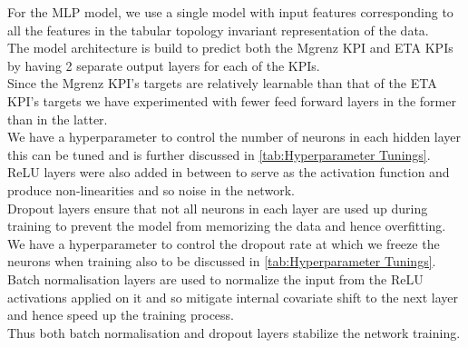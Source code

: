 \documentclass{report} %
\begin{document}
For the \ac{MLP} model, we use a single model with input features corresponding to all the features in the tabular topology invariant representation of the data.\\
The model architecture is build to predict both the Mgrenz \ac{KPI} and ETA \ac{KPI}s by having 2 separate output layers for each of the \ac{KPI}s. \\
Since the Mgrenz \ac{KPI}'s targets are relatively learnable than that of the ETA \ac{KPI}'s targets we have experimented with fewer feed forward layers in the former than in the latter. \\
We have a hyperparameter to control the number of neurons in each hidden layer this can be tuned and is further discussed in \ref{tab:Hyperparameter Tunings}.\\
\ac{ReLU} layers were also added in between to serve as the activation function and produce non-linearities and so noise in the network. \\
Dropout layers ensure that not all neurons in each layer are used up during training to prevent the model from memorizing the data and hence overfitting.  
We have a hyperparameter to control the dropout rate at which we freeze the neurons when training also to be discussed in \ref{tab:Hyperparameter Tunings}.\\
Batch normalisation layers are used to normalize the input from the \ac{ReLU} activations applied on it and so mitigate internal covariate shift to the next layer and hence speed up the training process.\\
Thus both batch normalisation and dropout layers stabilize the network training.\\
\end{document}
